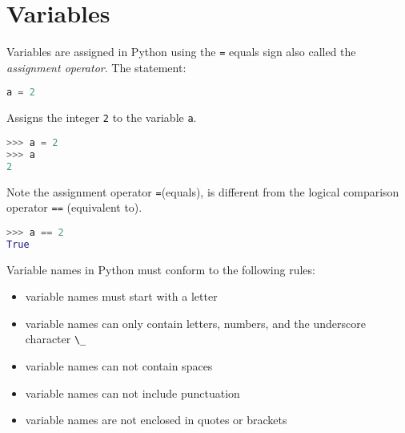 \documentclass{book}
\providecommand{\tightlist}{%
      \setlength{\itemsep}{0pt}\setlength{\parskip}{0pt}}
\newcommand{\passthrough}[1]{#1}
\begin{document}
    
        \hypertarget{variables}{%
\section{Variables}\label{variables}}
    




    
        Variables are assigned in Python using the \passthrough{\lstinline!=!}
equals sign also called the \emph{assignment operator}. The statement:

\begin{lstlisting}[language=Python]
a = 2
\end{lstlisting}

Assigns the integer \passthrough{\lstinline!2!} to the variable
\passthrough{\lstinline!a!}.
    




    
        \begin{lstlisting}[language=Python]
>>> a = 2
>>> a
2
\end{lstlisting}
    




    
        Note the assignment operator \passthrough{\lstinline!=!}(equals), is
different from the logical comparison operator
\passthrough{\lstinline!==!} (equivalent to).
    




    
        \begin{lstlisting}[language=Python]
>>> a == 2
True
\end{lstlisting}
    




    
        Variable names in Python must conform to the following rules:

\begin{itemize}
\tightlist
\item
  variable names must start with a letter
\item
  variable names can only contain letters, numbers, and the underscore
  character \passthrough{\lstinline!\_!}
\item
  variable names can not contain spaces
\item
  variable names can not include punctuation
\item
  variable names are not enclosed in quotes or brackets
\end{itemize}
    
\end{document}
